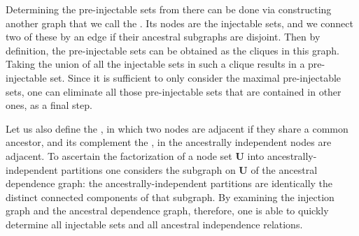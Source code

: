 {Determining the pre-injectable sets from there can be done via constructing another graph that we call the . Its nodes are the injectable sets, and we connect two of these by an edge if their ancestral subgraphs are disjoint. Then by definition, the pre-injectable sets can be obtained as the cliques in this graph. Taking the union of all the injectable sets in such a clique results in a pre-injectable set. Since it is sufficient to only consider the maximal pre-injectable sets, one can eliminate all those pre-injectable sets that are contained in other ones, as a final step.

Let us also define the , in which two nodes are adjacent if they share a common ancestor, and its complement the , in the ancestrally independent nodes are adjacent. To ascertain the factorization of a node set $\bm{U}$ into ancestrally-independent partitions one considers the subgraph on  $\bm{U}$ of the ancestral dependence graph: the ancestrally-independent partitions are identically the distinct connected components of that subgraph. By examining the injection graph and the ancestral dependence graph, therefore, one is able to quickly determine all injectable sets and all ancestral independence relations.


}
